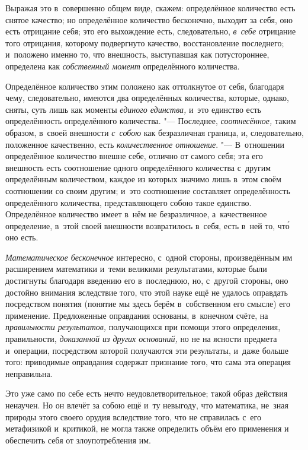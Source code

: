 Выражая это в~совершенно общем виде, скажем: определённое количество есть
снятое качество; но определённое количество бесконечно, выходит за себя, оно
есть отрицание себя; это его выхождение есть, следовательно, {\em в~себе}
отрицание того отрицания, которому подвергнуто качество, восстановление
последнего; и~положено именно то, что внешность, выступавшая как потустороннее,
определена как {\em собственный момент} определённого количества.

Определённое количество этим положено как оттолкнутое от себя, благодаря чему,
следовательно, имеются два определённых количества, которые, однако, сняты,
суть лишь как моменты {\em единого единства,} и~это единство есть
определённость определённого количества. "--- Последнее, {\em соотнесённое,}
таким образом, в~своей внешности {\em с~собою} как безразличная граница, и,
следовательно, положенное качественно, есть {\em количественное отношение}.
"--- В~отношении определённое количество внешне себе, отлично от самого себя;
эта его внешность есть соотношение одного определённого количества с~другим
определённым количеством, каждое из которых значимо лишь в~этом своём
соотношении со своим другим; и~это соотношение составляет определённость
определённого количества, представляющего собою такое единство. Определённое
количество имеет в~нём не безразличное, а~качественное определение, в~этой
своей внешности возвратилось в~себя, есть в~ней то, чт\'{о} оно есть.


{\em Математическое бесконечное} интересно, с~одной стороны, произведённым им
расширением математики и~теми великими результатами, которые были достигнуты
благодаря введению его в~последнюю, но, с~другой стороны, оно достойно внимания
вследствие того, что этой науке ещё не удалось оправдать посредством понятия
(понятие мы здесь берём в~собственном его смысле) его применение. Предложенные
оправдания основаны, в~конечном счёте, на {\em правильности результатов,}
получающихся при помощи этого определения, правильности,
{\em доказанной из других оснований,} но не на ясности предмета и~операции,
посредством которой получаются эти результаты, и~даже больше того: приводимые
оправдания содержат признание того, что сама эта операция неправильна.

Это уже само по себе есть нечто неудовлетворительное; такой образ действия
ненаучен. Но он влечёт за собою ещё и~ту невыгоду, что математика, не~зная
природы этого своего орудия вследствие того, что не справилась с~его
метафизикой и~критикой, не могла также определить объём его применения
и обеспечить себя от злоупотребления им.

